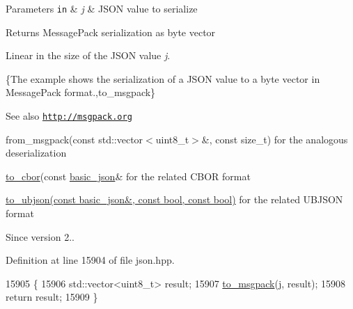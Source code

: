 \begin{DoxyParams}[1]{Parameters}
\mbox{\tt in}  & {\em j} & J\+S\+ON value to serialize \\
\hline
\end{DoxyParams}
\begin{DoxyReturn}{Returns}
Message\+Pack serialization as byte vector
\end{DoxyReturn}
Linear in the size of the J\+S\+ON value {\itshape j}.

\{The example shows the serialization of a J\+S\+ON value to a byte vector in Message\+Pack format.,to\+\_\+msgpack\}

\begin{DoxySeeAlso}{See also}
\href{http://msgpack.org}{\tt http\+://msgpack.\+org} 

from\+\_\+msgpack(const std\+::vector$<$uint8\+\_\+t$>$\&, const size\+\_\+t) for the analogous deserialization 

\hyperlink{classnlohmann_1_1basic__json_a2566783e190dec524bf3445b322873b8}{to\+\_\+cbor}(const \hyperlink{classnlohmann_1_1basic__json}{basic\+\_\+json}\& for the related C\+B\+OR format 

\hyperlink{classnlohmann_1_1basic__json_ae1ece6c2059114eac10873f13ef19185}{to\+\_\+ubjson(const basic\+\_\+json\&, const bool, const bool)} for the related U\+B\+J\+S\+ON format
\end{DoxySeeAlso}
\begin{DoxySince}{Since}
version 2.. 
\end{DoxySince}


Definition at line 15904 of file json.\+hpp.


\begin{DoxyCode}
15905     \{
15906         std::vector<uint8\_t> result;
15907         \hyperlink{classnlohmann_1_1basic__json_a09ca1dc273d226afe0ca83a9d7438d9c}{to\_msgpack}(j, result);
15908         \textcolor{keywordflow}{return} result;
15909     \}
\end{DoxyCode}
\mbox{\label{classnlohmann_1_1basic__json_a4ef190107be36fea6b6c63d71d439c99}} 
